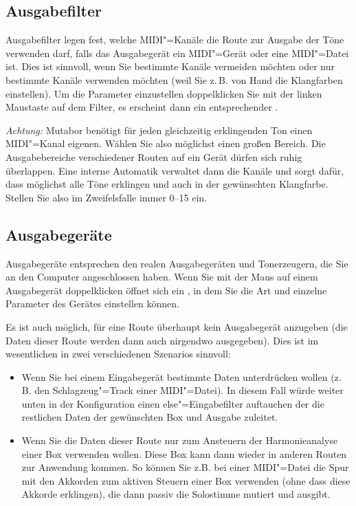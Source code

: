 \subsection{Ausgabefilter}\label{sec:ausgabefilter}

Ausgabefilter legen fest, welche MIDI"=Kanäle die Route zur Ausgabe der 
Töne verwenden darf, falls das Ausgabegerät ein MIDI"=Gerät 
oder eine MIDI"=Datei ist. Dies ist sinnvoll, wenn Sie bestimmte 
Kanäle vermeiden möchten oder nur bestimmte Kanäle verwenden 
möchten (weil Sie z.\,B. von Hand die Klangfarben einstellen). 
Um die Parameter einzustellen doppelklicken Sie mit der linken 
Maustaste auf dem Filter, es erscheint dann ein entsprechender 
.


\emph{Achtung:} Mutabor benötigt für jeden gleichzeitig erklingenden
Ton einen MIDI"=Kanal eigenen. Wählen Sie also möglichst einen großen
Bereich. Die Ausgabebereiche verschiedener Routen auf ein Gerät dürfen
sich ruhig überlappen. Eine interne Automatik verwaltet dann die
Kanäle und sorgt dafür, dass möglichst alle Töne erklingen und auch in
der gewünschten Klangfarbe. Stellen Sie also im Zweifelsfalle immer
0--15 ein.

\subsection{Ausgabegeräte}\label{sec:ausgabegerate}

Ausgabegeräte entsprechen den realen Ausgabegeräten und Tonerzeugern, die Sie
an den Computer angeschlossen haben. Wenn Sie mit der Maus auf einem
Ausgabegerät doppelklicken öffnet sich ein
, in dem Sie die Art und einzelne Parameter
des Gerätes einstellen können.


Es ist auch möglich, für eine Route überhaupt kein Ausgabegerät 
anzugeben (die Daten dieser Route werden dann auch nirgendwo ausgegeben). 
Dies ist im wesentlichen in zwei verschiedenen Szenarios sinnvoll:

\begin{itemize}
\item Wenn Sie bei einem Eingabegerät bestimmte Daten unterdrücken
  wollen (z.\,B. den Schlagzeug"=Track einer MIDI"=Datei). In diesem
  Fall würde weiter unten in der Konfiguration einen
  else"=Eingabefilter auftauchen der die restlichen Daten der
  gewünschten Box und Ausgabe zuleitet.
\item Wenn Sie die Daten dieser Route nur zum Ansteuern der
  Harmonieanalyse einer Box verwenden wollen. Diese Box kann dann
  wieder in anderen Routen zur Anwendung kommen. So können Sie z.B.
  bei einer MIDI"=Datei die Spur mit den Akkorden zum aktiven Steuern
  einer Box verwenden (ohne dass diese Akkorde erklingen), die dann
  passiv die Solostimme mutiert und ausgibt.
\end{itemize}


